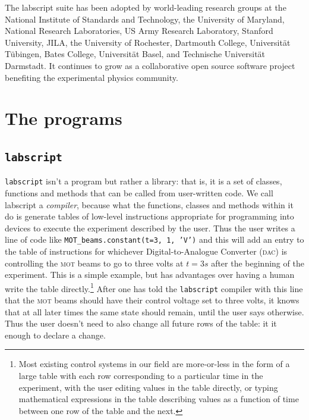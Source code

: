 The labscript suite has been adopted by world-leading research groups at the National Institute of Standards and Technology, the University of Maryland, National Research Laboratories, US Army Research Laboratory, Stanford University, JILA, the University of Rochester, Dartmouth College, Universit\"at T\"ubingen, Bates College, Universit\"at Basel, and Technische Universit\"at Darmstadt. It continues to grow as a collaborative open source software project benefiting the experimental physics community.


\section{The programs}


\subsection{\texttt{labscript}}

\texttt{labscript} isn't a program but rather a library: that is, it is a set of classes, functions and methods that can be called from user-written code. We call labscript a \emph{compiler}, because what the functions, classes and methods within it do is generate tables of low-level instructions appropriate for programming into devices to execute the experiment described by the user. Thus the user writes a line of code like \hbox{\texttt{MOT\_beams.constant(t=3, 1, 'V')}} and this will add an entry to the table of instructions for whichever Digital-to-Analogue Converter (\textsc{dac}) is controlling the \textsc{mot} beams to go to three volts at $t = 3\unit{s}$ after the beginning of the experiment. This is a simple example, but has advantages over having a human write the table directly.\footnote{Most existing control systems in our field are more-or-less in the form of a large table with each row corresponding to a particular time in the experiment, with the user editing values in the table directly, or typing mathematical expressions in the table describing values as a function of time between one row of the table and the next.} After one has told the \texttt{labscript} compiler with this line that the \textsc{mot} beams should have their control voltage set to three volts, it knows that at all later times the same state should remain, until the user says otherwise. Thus the user doesn't need to also change all future rows of the table: it it enough to declare a change. 

